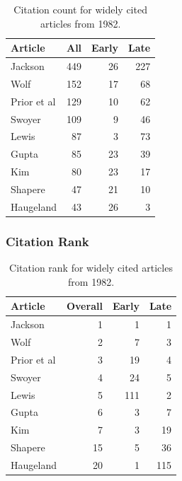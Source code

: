 \documentclass[
  10pt,
  letterpaper,
  DIV=11,
  numbers=noendperiod,
  twoside]{scrartcl}
\begin{document}
\begin{longtable}[]{@{}lrrr@{}}

\caption{\label{tbl-citation-count-1982}Citation count for widely cited
articles from 1982.}

\tabularnewline

\toprule\noalign{}
Article & All & Early & Late \\
\midrule\noalign{}
\endhead
\bottomrule\noalign{}
\endlastfoot
Jackson & 449 & 26 & 227 \\
Wolf & 152 & 17 & 68 \\
Prior et al & 129 & 10 & 62 \\
Swoyer & 109 & 9 & 46 \\
Lewis & 87 & 3 & 73 \\
Gupta & 85 & 23 & 39 \\
Kim & 80 & 23 & 17 \\
Shapere & 47 & 21 & 10 \\
Haugeland & 43 & 26 & 3 \\

\end{longtable}

\subsubsection*{Citation Rank}\label{sec-rank-1982}

\begin{longtable}[]{@{}lrrr@{}}

\caption{\label{tbl-citation-rank-1982}Citation rank for widely cited
articles from 1982.}

\tabularnewline

\toprule\noalign{}
Article & Overall & Early & Late \\
\midrule\noalign{}
\endhead
\bottomrule\noalign{}
\endlastfoot
Jackson & 1 & 1 & 1 \\
Wolf & 2 & 7 & 3 \\
Prior et al & 3 & 19 & 4 \\
Swoyer & 4 & 24 & 5 \\
Lewis & 5 & 111 & 2 \\
Gupta & 6 & 3 & 7 \\
Kim & 7 & 3 & 19 \\
Shapere & 15 & 5 & 36 \\
Haugeland & 20 & 1 & 115 \\

\end{longtable}
\end{document}
